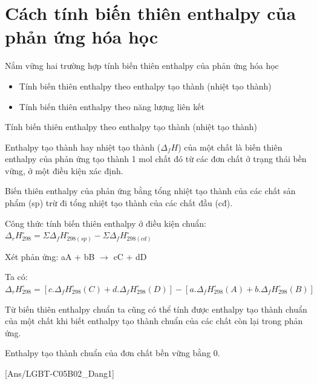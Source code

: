 \documentclass[Main.tex]{subfiles}
\begin{document}
	\section{Cách tính biến thiên enthalpy 
		của phản ứng hóa học 
	}
	\begin{Muctieu}
		Nắm vững hai trường hợp tính biến thiên enthalpy của phản ứng hóa học
		\begin{itemize}
			\item Tính biến thiên enthalpy theo enthalpy tạo thành (nhiệt tạo thành) 
			\item Tính biến thiên enthalpy theo năng lượng liên kết
		\end{itemize}
	\end{Muctieu}
	\begin{dang} {Tính biến thiên enthalpy theo enthalpy tạo thành (nhiệt tạo thành)}
	\end{dang}
	\begin{phuongphap}
		\begin{cacbuoc}
			\item Enthalpy tạo thành hay nhiệt tạo thành ($\Delta_f H$) của một chất là biến thiên enthalpy của phản ứng tạo thành 1 mol chất đó từ các đơn chất ở trạng thái bền vững, ở một điều kiện xác định.
			\item Biến thiên enthalpy của phản ứng bằng tổng nhiệt tạo thành của các chất sản phẩm (sp) trừ đi tổng nhiệt tạo thành của các chất đầu (cđ).
			\item Công thức tính biến thiên enthalpy ở điều kiện chuẩn: $\Delta_r H_{298}^\circ = \Sigma \Delta_f H_{298(sp)}^\circ - \Sigma \Delta_f H_{298(cd)}^\circ$
			\item Xét phản ứng: aA + bB $\rightarrow$ cC + dD
			\item Ta có: $\Delta_r H_{298}^\circ = [c.\Delta_f H_{298}^\circ (C) + d.\Delta_f H_{298}^\circ (D)] - [a.\Delta_f H_{298}^\circ (A) + b.\Delta_f H_{298}^\circ (B)]$
			\item Từ biến thiên enthalpy chuẩn ta cũng có thể tính được enthalpy tạo thành chuẩn của một chất khi biết enthalpy tạo thành chuẩn của các chất còn lại trong phản ứng.
		\end{cacbuoc}
	\end{phuongphap}
	\begin{luuy}
		Enthalpy tạo thành chuẩn của đơn chất bền vững bằng 0.
	\end{luuy}
	[Ans/LGBT-C05B02_Dang1]
\end{document}
